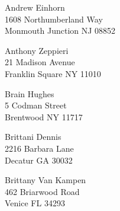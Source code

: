 \documentclass{article}
\begin{document}
\begin{center}
\begin{Huge}

\vspace*{\fill}
Andrew Einhorn\\
1608 Northumberland Way\\
Monmouth Junction NJ 08852\\
\vspace{\fill}

\clearpage

\vspace*{\fill}
Anthony Zeppieri\\
21 Madison Avenue\\
Franklin Square NY 11010\\
\vspace{\fill}

\clearpage

\vspace*{\fill}
Brain Hughes\\
5 Codman Street\\
Brentwood NY 11717\\
\vspace{\fill}

\clearpage

\vspace*{\fill}
Brittani Dennis\\
2216 Barbara Lane\\
Decatur GA 30032\\
\vspace{\fill}

\clearpage

\vspace*{\fill}
Brittany Van Kampen\\
462 Briarwood Road\\
Venice FL 34293\\
\vspace{\fill}

\clearpage

\end{Huge}
\end{center}
\end{document}
